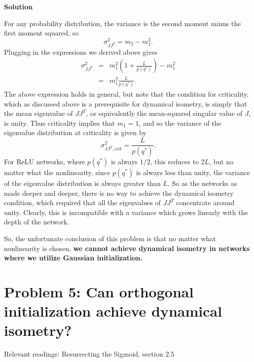 \documentclass[a4paper]{article}
\begin{document}
\begin{enumerate}[label=(\alph*)]
\begin{tcolorbox}
\textbf{Solution}

For any probability distribution, the variance is the second moment minus the first moment squared, so 
\begin{equation}
    \sigma_{JJ^T}^2 = m_2 - m_1^2.
\end{equation}
Plugging in the expressions we derived above gives
\begin{eqnarray}
    \sigma_{JJ^T}^2 &=& m_1^2 \left( 1 + \frac{L}{p(q^*)} \right) - m_1^2 \\
    &=& m_1^2 \frac{L}{p(q^*)}.
\end{eqnarray}
The above expression holds in general, but note that the condition for criticality, which as discussed above is a prerequisite for dynamical isometry, is simply that the mean eigenvalue of $JJ^T$, or equivalently the mean-squared singular value of $J$, is unity.  Thus criticality implies that $m_1 = 1$, and so the variance of the eigenvalue distribution at criticality is given by
\begin{equation}
    \sigma_{JJ^T, \mathrm{crit}}^2 = \frac{L}{p(q^*)}.
\end{equation}
For ReLU networks, where $p(q^*)$ is always $1/2$, this reduces to $2L$, but no matter what the nonlinearity, since $p(q^*)$ is always less than unity, the variance of the eigenvalue distribution is always greater than $L$.  So as the networks as made deeper and deeper, there is no way to achieve the dynamical isometry condition, which required that all the eigenvalues of $JJ^T$ concentrate around unity.  Clearly, this is incompatible with a variance which grows linearly with the depth of the network.  

So, the unfortunate conclusion of this problem is that no matter what nonlinearity is chosen, \textbf{we cannot achieve dynamical isometry in networks where we utilize Gaussian initialization.}


\end{tcolorbox}

\end{enumerate}



\section*{Problem 5: Can orthogonal initialization achieve dynamical isometry?}

Relevant readings: Resurrecting the Sigmoid, section 2.5
\end{document}
